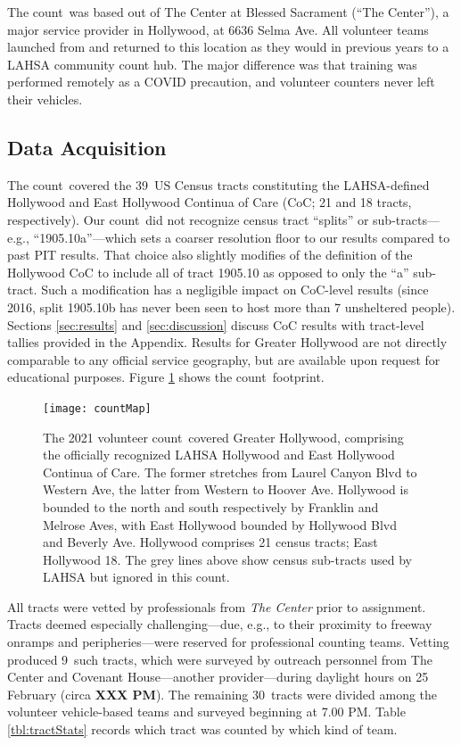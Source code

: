 \documentclass[11pt,twocolumn]{article}
\def\bfr{\bf\color{red}}
\def\Count{count}
\def\ntracts{39}
\def\nprof{9}
\def\nvol{30}
\def\resp{respectively}
\begin{document}
The \Count\ was based out of The Center at Blessed Sacrament (``The Center''), a major service 
provider in Hollywood, at 6636 Selma Ave. All volunteer teams launched from and returned to this 
location as they would in previous years to a LAHSA community count hub. The major difference 
was that training was performed remotely as a COVID precaution, and volunteer counters never left 
their vehicles.

\subsection{Data Acquisition}
\label{sec:acquisition}

The \Count\ covered the \ntracts\ US Census tracts constituting the LAHSA-defined Hollywood 
and East Hollywood Continua of Care (CoC; 21 and 18 tracts, \resp). Our \Count\ did not recognize census 
tract ``splits'' or sub-tracts---e.g., ``1905.10a''---which sets a coarser resolution floor to our results 
compared to past PIT results. That choice also slightly modifies of the definition of the Hollywood CoC 
to include all of tract 1905.10 as opposed to only the ``a'' sub-tract. Such a modification has a negligible 
impact on CoC-level results (since 2016, split 1905.10b has never been seen to host more than 7 unsheltered 
people). Sections \ref{sec:results} and \ref{sec:discussion} discuss CoC results with tract-level tallies provided
in the Appendix. Results for Greater Hollywood are not directly comparable to any official service 
geography, but are available upon request for educational purposes. Figure \ref{fig:map} shows 
the \Count\ footprint.

\begin{figure}
	\centering
	\texttt{[image: countMap]}
	\caption{The 2021 volunteer \Count\ covered Greater Hollywood, comprising the 
			officially recognized LAHSA Hollywood and East Hollywood Continua
			of Care. The former stretches from Laurel Canyon Blvd to Western Ave,
			the latter from Western to Hoover Ave. Hollywood is bounded to the north
			and south respectively by Franklin	and Melrose Aves, with East Hollywood
			bounded by Hollywood Blvd and Beverly Ave. Hollywood comprises
			21 census tracts; East Hollywood 18. The grey lines above show census 
			sub-tracts used by LAHSA but ignored in this \Count.}
	\label{fig:map}	
\end{figure}

All tracts were vetted by professionals from {\it The Center} prior to assignment. Tracts deemed 
especially challenging---due, e.g., to their proximity to freeway onramps and peripheries---were 
reserved for professional counting teams. Vetting produced \nprof\ such tracts, which were surveyed 
by outreach personnel from The Center and Covenant House---another provider---during daylight hours on 25 
February (circa {\bfr XXX PM}). The remaining \nvol\ tracts were divided among the volunteer 
vehicle-based teams and surveyed beginning at 7.00 PM. Table \ref{tbl:tractStats} records which tract
was counted by which kind of team.
\end{document}
